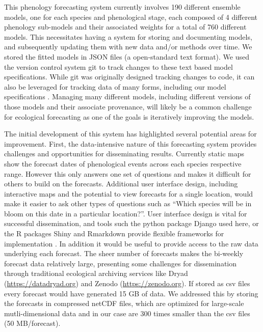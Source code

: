 This phenology forecasting system currently involves 190 different ensemble models, one for each species and phenological stage, each composed of 4 different phenology sub-models and their associated weights for a total of 760 different models. This necessitates having a system for storing and documenting models, and subsequently updating them with new data and/or methods over time. We stored the fitted models in JSON files (a open-standard text format). We used the version control system git to track changes to these text based model specifications. While git was originally designed tracking changes to code, it can also be leveraged for tracking data of many forms, including our model specifications \citep{ram2013, bryan2018, yenni2019}. Managing many different models, including different versions of those models and their associate provenance, will likely be a common challenge for ecological forecasting \citep{white2018} as one of the goals is iteratively improving the models.

The initial development of this system has highlighted several potential areas for improvement. First, the data-intensive nature of this forecasting system provides challenges and opportunities for disseminating results. Currently static maps show the forecast dates of phenological events across each species respective range. However this only answers one set of questions and makes it difficult for others to build on the forecasts. Additional user interface design, including interactive maps and the potential to view forecasts for a single location, would make it easier to ask other types of questions such as “Which species will be in bloom on this date in a particular location?”. User interface design is vital for successful dissemination, and tools such the python package Django used here, or the R packages Shiny and Rmarkdown provide flexible frameworks for implementation \citep{white2018, welch2019}. In addition it would be useful to provide access to the raw data underlying each forecast. The sheer number of forecasts makes the bi-weekly forecast data relatively large, presenting some challenges for dissemination through traditional ecological archiving services like Dryad (\href{https://datadryad.org}{https://datadryad.org}) and Zenodo (\href{https://zenodo.org}{https://zenodo.org}). If stored as csv files every forecast would have generated 15 GB of data. We addressed this by storing the forecasts in compressed netCDF files, which are optimized for large-scale mutli-dimensional data and in our case are 300 times smaller than the csv files (50 MB/forecast).

